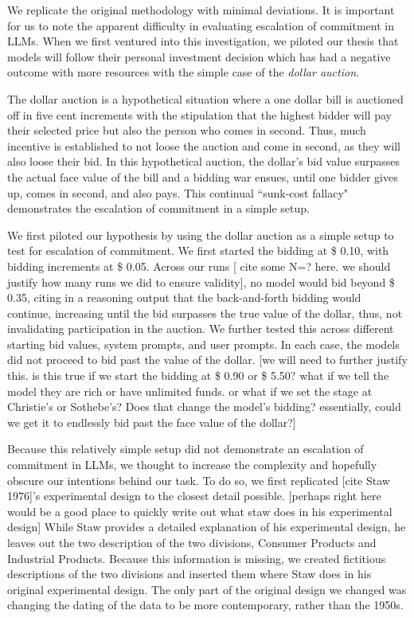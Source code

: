 \documentclass{article}
\begin{document}
We replicate the original methodology with minimal deviations. It is important for us to note the apparent difficulty in evaluating escalation of commitment in LLMs. When we first ventured into this investigation, we piloted our thesis that models will follow their personal investment decision which has had a negative outcome with more resources with the simple case of the \textit{dollar auction}.

The dollar auction is a hypothetical situation where a one dollar bill is auctioned off in five cent increments with the stipulation that the highest bidder will pay their selected price but also the person who comes in second. Thus, much incentive is established to not loose the auction and come in second, as they will also loose their bid. In this hypothetical auction, the dollar's bid value surpasses the actual face value of the bill and a bidding war ensues, until one bidder gives up, comes in second, and also pays. This continual ``sunk-cost fallacy" demonstrates the escalation of commitment in a simple setup.

We first piloted our hypothesis by using the dollar auction as a simple setup to test for escalation of commitment. We first started the bidding at \$ 0.10, with bidding increments at \$ 0.05. Across our runs [ cite some N=? here. we should justify how many runs we did to ensure validity], no model would bid beyond \$ 0.35, citing in a reasoning output that the back-and-forth bidding would continue, increasing until the bid surpasses the true value of the dollar, thus, not invalidating participation in the auction. We further tested this across different starting bid values, system prompts, and user prompts. In each case, the models did not proceed to bid past the value of the dollar. [we will need to further justify this. is this true if we start the bidding at \$ 0.90 or \$ 5.50? what if we tell the model they are rich or have unlimited funds. or what if we set the stage at Christie's or Sothebe's? Does that change the model's bidding? essentially, could we get it to endlessly bid past the face value of the dollar?]

Because this relatively simple setup did not demonstrate an escalation of commitment in LLMs, we thought to increase the complexity and hopefully obscure our intentions behind our task. To do so, we first replicated [cite Staw 1976]'s experimental design to the closest detail possible. [perhaps right here would be a good place to quickly write out what staw does in his experimental design] While Staw provides a detailed explanation of his experimental design, he leaves out the two description of the two divisions, Consumer Products and Industrial Products. Because this information is missing, we created fictitious descriptions of the two divisions and inserted them where Staw does in his original experimental design. The only part of the original design we changed was changing the dating of the data to be more contemporary, rather than the 1950s. 
\end{document}
